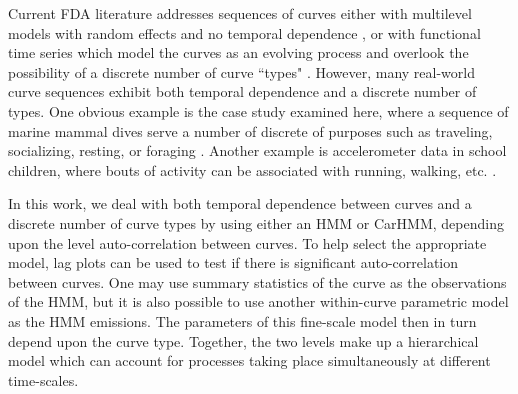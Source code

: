 

Current FDA literature addresses sequences of curves either with multilevel models with random effects and no temporal dependence \citep{chen:2012,di:2009}, or with functional time series which model the curves as an evolving process and overlook the possibility of a discrete number of curve ``types" \citep{Kokoszka:2018}. However, many real-world curve sequences exhibit both temporal dependence and a discrete number of types. One obvious example is the case study examined here, where a sequence of marine mammal dives serve a number of discrete of purposes such as traveling, socializing, resting, or foraging \citep{Tennessen:2019a}. Another example is accelerometer data in school children, where bouts of activity can be associated with running, walking, etc. \citep{Morris:2007}.

In this work, we deal with both temporal dependence between curves and a discrete number of curve types by using either an HMM or CarHMM, depending upon the level auto-correlation between curves. To help select the appropriate model, lag plots can be used to test if there is significant auto-correlation between curves. One may use summary statistics of the curve as the observations of the HMM, but it is also possible to use another within-curve parametric model as the HMM emissions. The parameters of this fine-scale model then in turn depend upon the curve type. Together, the two levels make up a hierarchical model which can account for processes taking place simultaneously at different time-scales.



